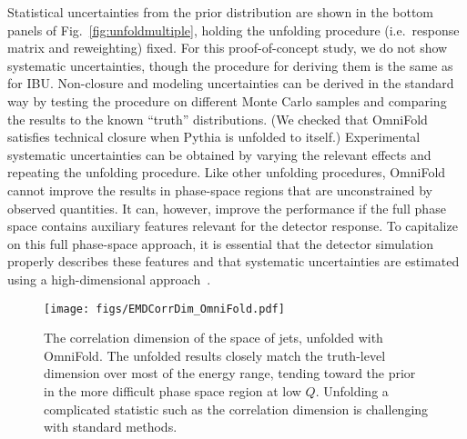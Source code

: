 \documentclass[prl,twocolumn,superscriptaddress,longbibliography,preprintnumbers,nofootinbib]{revtex4-1}
\DeclareRobustCommand{\Fig}[1]{Fig.~\ref{fig:#1}}
\newcommand{\Pythia}{{\sc Pythia}\xspace}
\newcommand{\OmniFold}{{\sc OmniFold}\xspace}
\begin{document}
Statistical uncertainties from the prior distribution are shown in the bottom panels of \Fig{unfoldmultiple}, holding the unfolding procedure (i.e.\ response matrix and reweighting) fixed.
%
For this proof-of-concept study, we do not show systematic uncertainties, though the procedure for deriving them is the same as for IBU.
%
Non-closure and modeling uncertainties can be derived in the standard way by testing the procedure on different Monte Carlo samples and comparing the results to the known ``truth'' distributions.
%
(We checked that \OmniFold satisfies technical closure when \Pythia is unfolded to itself.)
%
Experimental systematic uncertainties can be obtained by varying the relevant effects and repeating the unfolding procedure.
%
Like other unfolding procedures, \OmniFold cannot improve the results in phase-space regions that are unconstrained by observed quantities.
%
It can, however, improve the performance if the full phase space contains auxiliary features relevant for the detector response.
%
To capitalize on this full phase-space approach, it is essential that the detector simulation properly describes these features and that systematic uncertainties are estimated using a high-dimensional approach~\cite{Nachman:2019yfl,Nachman:2019dol}.




\begin{figure}[t]
    \centering
    \texttt{[image: figs/EMDCorrDim\_OmniFold.pdf]}
    \caption{
    The correlation dimension of the space of jets, unfolded with \OmniFold.
    The unfolded results closely match the truth-level dimension over most of the energy range, tending toward the prior in the more difficult phase space region at low $Q$.
    Unfolding a complicated statistic such as the correlation dimension is challenging with standard methods.
    }
    \label{fig:corrdim}
\end{figure}
\end{document}
